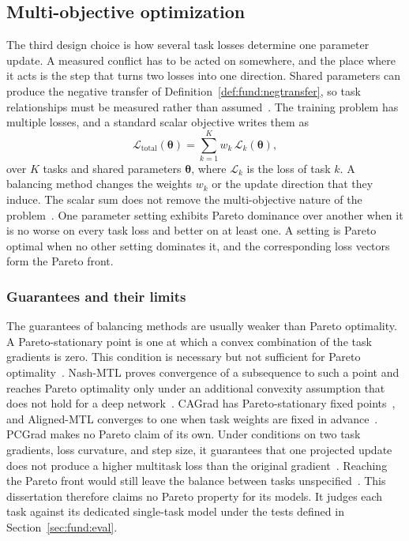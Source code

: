 \subsection{Multi-objective optimization}

The third design choice is how several task losses determine one parameter update. A
measured conflict has to be acted on somewhere, and the place where it acts is the step
that turns two losses into one direction. Shared parameters can produce the negative
transfer of Definition~\ref{def:fund:negtransfer}, so task relationships must be measured
rather than assumed~\cite{standley2020tasks}. The training problem has
multiple losses, and a standard scalar objective writes them as
\begin{equation}\label{eq:fund:mtl-total}
    \mathcal{L}_{\mathrm{total}}(\boldsymbol{\theta})
    = \sum_{k=1}^{K} w_k\,\mathcal{L}_k(\boldsymbol{\theta}),
\end{equation}
over $K$ tasks and shared parameters $\boldsymbol{\theta}$, where $\mathcal{L}_k$ is the
loss of task $k$. A balancing method changes the weights $w_k$ or the update direction
that they induce. The scalar sum does not
remove the multi-objective nature of the problem~\cite{sener2018mgda}. One parameter
setting exhibits Pareto dominance over another when it is no worse on every task loss
and better on at least one. A setting is Pareto optimal when no other setting dominates
it, and the corresponding loss vectors form the Pareto front.

\subsubsection{Guarantees and their limits}

The guarantees of balancing methods are usually weaker than Pareto optimality. A
Pareto-stationary point is one at which a convex combination of the task gradients is
zero. This condition is necessary but not sufficient for Pareto
optimality~\cite{nash}. Nash-MTL proves convergence of a subsequence to such a point
and reaches Pareto optimality only under an additional convexity assumption that does
not hold for a deep network~\cite{nash}. CAGrad has Pareto-stationary fixed
points~\cite{liu2021cagrad}, and Aligned-MTL converges to one when task weights are
fixed in advance~\cite{senushkin2023aligned}. PCGrad makes no Pareto claim of its own. Under
conditions on two task gradients, loss curvature, and step size, it guarantees that
one projected update does not produce a higher multitask loss than the original
gradient~\cite{yu2020pcgrad}. Reaching the Pareto front would still leave the balance
between tasks unspecified~\cite{liu2021cagrad,senushkin2023aligned}. This
dissertation therefore claims no Pareto property for its models. It judges each task
against its dedicated single-task model under the tests defined in
Section~\ref{sec:fund:eval}.


